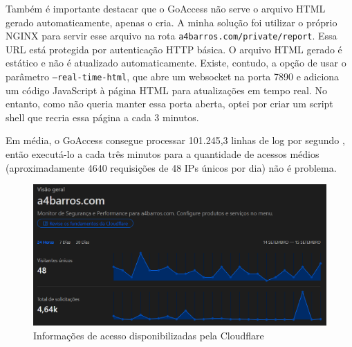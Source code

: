 Também é importante destacar que o GoAccess não serve o arquivo HTML gerado 
automaticamente, apenas o cria. A minha solução foi utilizar o próprio NGINX para 
servir esse arquivo na rota \texttt{a4barros.com/private/report}. Essa URL está 
protegida por autenticação HTTP básica. O arquivo HTML gerado é estático e não é 
atualizado automaticamente. Existe, contudo, a opção de usar o parâmetro 
\texttt{--real-time-html}, que abre um websocket na porta 7890 e adiciona um código 
JavaScript à página HTML para atualizações em tempo real. No entanto, como não 
queria manter essa porta aberta, optei por criar um script shell que recria essa
página a cada 3 minutos.



Em média, o GoAccess consegue processar 101.245,3 linhas de log por segundo 
\cite{goaccess-speed}, então executá-lo a cada três minutos para a quantidade de 
acessos médios (aproximadamente 4640 requisições de 48 IPs únicos por dia) não 
é problema.

\begin{figure}[ht]
    \begin{center}
    \includegraphics[width=400pt]{img/cloudflare-stat.png}
    \caption{Informações de acesso disponibilizadas pela Cloudflare}
    \label{fig:cloudflare-stat.png}
    \end{center}
\end{figure}
